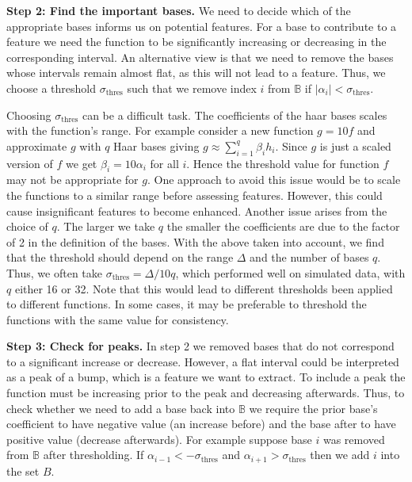 \documentclass[../main.tex]{subfiles}
\begin{document}
{\bf Step 2: Find the important bases.} We need to decide which of the appropriate bases informs us on potential features. For a base to contribute to a feature we need the function to be significantly increasing or decreasing in the corresponding interval. An alternative view is that we need to remove the bases whose intervals remain almost flat, as this will not lead to a feature. Thus, we choose a threshold $\sigma_\mathrm{thres}$ such that we remove index $i$ from $\mathbb{B}$ if $|\alpha_i| < \sigma_\mathrm{thres}$.
 
 Choosing $\sigma_\mathrm{thres}$ can be a difficult task. The coefficients of the haar bases scales with the function's range. For example consider a new function $g = 10f$ and approximate $g$ with $q$ Haar bases giving $g \approx \sum^q_{i=1} \beta_i h_i$. Since $g$ is just a scaled version of $f$ we get $\beta_i = 10\alpha_i$ for all $i$. Hence the threshold value for function $f$ may not be appropriate for $g$. One approach to avoid this issue would be to scale the functions to a similar range before assessing features. However, this could cause insignificant features to become enhanced. Another issue arises from the choice of $q$. The larger we take $q$ the smaller the coefficients are due to the factor of 2 in the definition of the bases. With the above taken into account, we find that the threshold should depend on the range $\Delta$ and the number of bases $q$. Thus, we often take $\sigma_\mathrm{thres} = \Delta/10q $, which performed well on simulated data, with $q$ either 16 or 32. Note that this would lead to different thresholds been applied to different functions. In some cases, it may be preferable to threshold the functions with the same value for consistency.



 {\bf Step 3: Check for peaks.} In step 2 we removed bases that do not correspond to a significant increase or decrease. However, a flat interval could be interpreted as a peak of a bump, which is a feature we want to extract. To include a peak the function must be increasing prior to the peak and decreasing afterwards. Thus, to check whether we need to add a base back into $\mathbb{B}$ we require the prior base's coefficient to have negative value (an increase before) and the base after to have positive value (decrease afterwards). For example suppose base $i$ was removed from $\mathbb{B}$ after thresholding. If $\alpha_{i-1} < - \sigma_\mathrm{thres}$ and $\alpha_{i+1} > \sigma_\mathrm{thres}$ then we add $i$ into the set $B$.
 
\end{document}
